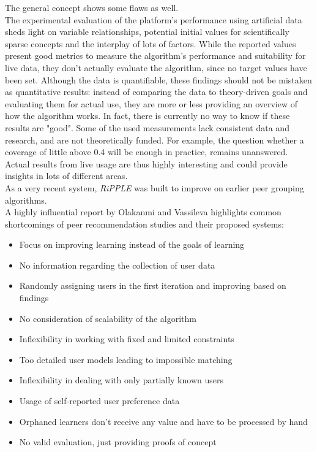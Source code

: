 \documentclass[conference]{IEEEtran}
\begin{document}
The general concept shows some flaws as well.\\


The experimental evaluation of the platform's performance using artificial data sheds light on variable relationships, potential initial values for scientifically sparse concepts and the interplay of lots of factors. While the reported values present good metrics to measure the algorithm's performance and suitability for live data, they don't actually evaluate the algorithm, since no target values have been set. Although the data is quantifiable, these findings should not be mistaken as quantitative results: instead of comparing the data to theory-driven goals and evaluating them for actual use, they are more or less providing an overview of how the algorithm works. In fact, there is currently no way to know if these results are "good". Some of the used measurements lack consistent data and research, and are not theoretically funded. For example, the question whether a coverage of little above 0.4 will be enough in practice, remains unanswered. Actual results from live usage are thus highly interesting and could provide insights in lots of different areas.\\
As a very recent system, \textit{RiPPLE} was built to improve on earlier peer grouping algorithms.\\
A highly influential report by Olakanmi and Vassileva \cite{olakanmi2017group} highlights common shortcomings of peer recommendation studies and their proposed systems:
\begin{itemize}
	\item Focus on improving learning instead of the goals of learning
	\item No information regarding the collection of user data
	\item Randomly assigning users in the first iteration and improving based on findings
	\item No consideration of scalability of the algorithm
	\item Inflexibility in working with fixed and limited constraints
	\item Too detailed user models leading to impossible matching
	\item Inflexibility in dealing with only partially known users
	\item Usage of self-reported user preference data
	\item Orphaned learners don't receive any value and have to be processed by hand
	\item No valid evaluation, just providing proofs of concept
\end{itemize}
\end{document}
